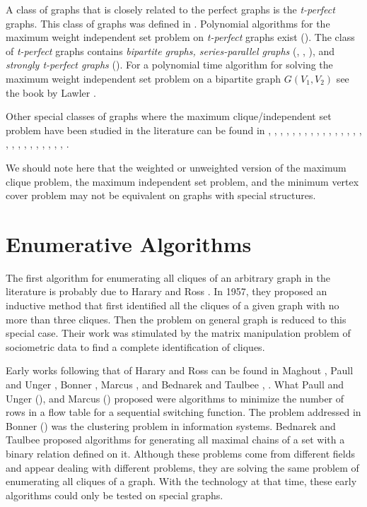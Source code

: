 A class of graphs that is closely related to the perfect graphs is
the {\em t-perfect} graphs. This class of graphs was defined in
\cite{Chv75}. Polynomial algorithms for the maximum weight
independent set problem on {\em t-perfect} graphs exist
(\cite{GrLoSc88}). The class of {\em t-perfect} graphs contains
{\em bipartite graphs, series-parallel graphs} (\cite{Dir52},
\cite{Chv75}, \cite{BoUh79}), and {\em strongly t-perfect graphs}
(\cite{GeSc86}). For a polynomial time algorithm for solving the
maximum weight independent set problem on a bipartite graph
$G( V_1 , V_2 )$ see the book by Lawler \cite{Law76}. 


Other special classes of graphs where the maximum clique/independent
set problem have been studied in the literature can be found in
\cite{Bal86}, \cite{Bur89}, \cite{ChNiSa82}, \cite{ChNiSa83},
\cite{ChNa91}, \cite{ChFr86}, \cite{Dir61}, \cite{Gav73},
\cite{Gav74}, \cite{GoHa88}, \cite{GrPu85}, \cite{GuLeLe82},
\cite{HoLe88}, \cite{Hsu85}, \cite{Hsu88}, \cite{HsIkNe81},
\cite{KaMaNaFu92} \cite{Kle88}, \cite{MaNa88}, \cite{MaNaKaFu90},
\cite{Min80}, \cite{NaNaSc87}, \cite{Ola89}, \cite{PaYa81},
\cite{Pul79}, \cite{RoUr81}, \cite{Sag88}, \cite{TaChLeHu90}. 


We should note here that the weighted or unweighted version of the
maximum clique problem, the maximum independent set problem, and
the minimum vertex cover problem may not be equivalent on graphs with
special structures.

\section{Enumerative Algorithms}

The first algorithm for enumerating all cliques of an arbitrary
graph in the literature is probably due to Harary and Ross
\cite{HaRo57}. In 1957, they proposed an inductive method that first
identified all the cliques of a given graph with no more than three
cliques. Then the problem on general graph is reduced to this
special case. Their work was stimulated by the matrix manipulation
problem of sociometric data to find a complete identification of
cliques.

Early works following that of Harary and Ross \cite{HaRo57} can be
found in Maghout \cite{Mag59}, Paull and Unger \cite{PaUn59}, Bonner
\cite{Bon64}, Marcus \cite{Mar64}, and Bednarek and Taulbee
\cite{BeTa66}, \cite{Dor69}. What Paull and Unger (\cite{PaUn59}),
and Marcus (\cite{Mar64}) proposed were algorithms to minimize the
number of rows in a flow table for a sequential switching function.
The problem addressed in Bonner (\cite{Bon64}) was the clustering
problem in information systems. Bednarek and Taulbee \cite{BeTa66}
proposed algorithms for generating all maximal chains of a set with
a binary relation defined on it. Although these problems come from
different fields and appear dealing with different problems, they
are solving the same problem of enumerating all cliques of a graph.
With the technology at that time, these early algorithms could only
be tested on special graphs.

